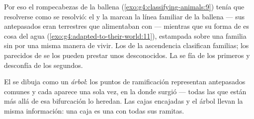 \begin{example}\label{ex:g6:classification-kinship:whale}
Por eso el rompecabezas de la ballena
(\cref{exo:g4:classifying-animals:9}) tenía que resolverse como se
resolvió: el  y la  marcan la línea familiar de la ballena ---
sus antepasados eran  terrestres que alimentaban con  ---
mientras que su forma de  es cosa del agua
(\cref{exo:g4:adapted-to-their-world:11}), estampada sobre una familia
sin  por una misma manera de vivir. Los  de la
ascendencia clasifican familias; los parecidos de  se los pueden
prestar unos desconocidos. La  se fía de los primeros y
desconfía de los segundos.
\end{example}

\begin{definition}\label{def:g6:classification-kinship:tree}
El  se dibuja como un \emph{árbol}: los puntos de ramificación representan antepasados comunes
y cada  aparece una sola vez, en la  donde surgió --- todas
las  que están más allá de esa bifurcación lo heredan. Las
cajas encajadas y el árbol llevan la misma información: una caja es una
 con todas sus ramitas.
\end{definition}

